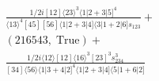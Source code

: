 \documentclass[varwidth, border=5pt]{standalone}
\begin{document}
\begin{my}
$\begin{gathered}
\scriptscriptstyle\frac{1/2i[12]⟨23⟩^3⟨1|2+3|5]^4}{⟨13⟩^4[45][56]⟨1|2+3|4]⟨3|1+2|6]s_{123}}+\\
\scriptscriptstyle(216543,\;\text{True})+\\
\scriptscriptstyle\frac{1/2i⟨12⟩[12]⟨16⟩^3[23]^3s_{234}^3}{[34]⟨56⟩⟨1|3+4|2]^4⟨1|2+3|4]⟨5|1+6|2]}\phantom{+}
\end{gathered}$
\end{my}
\end{document}
